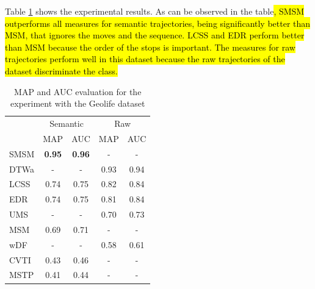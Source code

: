 \documentclass[12pt]{article}
\begin{document}
Table \ref{tab:geolife_measures_map_auc} shows the experimental results. As can be observed in the table\hl{, SMSM outperforms all measures for semantic trajectories, being significantly better than MSM, that ignores the moves and the sequence. LCSS and EDR perform better than MSM because the order of the stops is important. The measures for raw trajectories perform well in this dataset because the raw trajectories of the dataset discriminate the class.}


\begin{table}[ht!]
  \scriptsize
  \centering
  \begin{tabular}{|l|c|c|c|c|}
  	\hline
 & \multicolumn{2}{c}{Semantic}& \multicolumn{2}{|c|}{Raw}\\
 	\cline{2-5}
 & MAP & AUC & MAP & AUC\\
  	\hline
SMSM & \textbf{0.95} & \textbf{0.96} & - & -\\
DTWa & - & - & 0.93 & 0.94\\
LCSS & 0.74 & 0.75 & 0.82 & 0.84\\
 EDR & 0.74 & 0.75 & 0.81 & 0.84\\
 UMS & - & - & 0.70 & 0.73\\
 MSM & 0.69 & 0.71 & - & -\\
 wDF & - & - & 0.58 & 0.61\\
CVTI & 0.43 & 0.46 & - & -\\
MSTP & 0.41 & 0.44 & - & -\\
    \hline
  \end{tabular}
  \caption{MAP and AUC evaluation for the experiment with the Geolife dataset}
  \label{tab:geolife_measures_map_auc}
\end{table}
\end{document}
